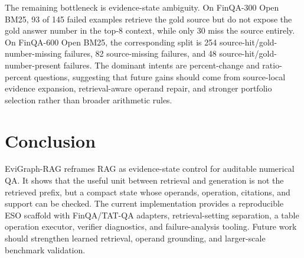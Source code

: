 \documentclass[letterpaper]{article}
\begin{document}
The remaining bottleneck is evidence-state ambiguity.
On FinQA-300 Open BM25, 93 of 145 failed examples retrieve the gold source but do not expose the gold answer number in the top-\(8\) context, while only 30 miss the source entirely.
On FinQA-600 Open BM25, the corresponding split is 254 source-hit/gold-number-missing failures, 82 source-missing failures, and 48 source-hit/gold-number-present failures.
The dominant intents are percent-change and ratio-percent questions, suggesting that future gains should come from source-local evidence expansion, retrieval-aware operand repair, and stronger portfolio selection rather than broader arithmetic rules.

\section{Conclusion}

EviGraph-RAG reframes RAG as evidence-state control for auditable numerical QA.
It shows that the useful unit between retrieval and generation is not the retrieved prefix, but a compact state whose operands, operation, citations, and support can be checked.
The current implementation provides a reproducible ESO scaffold with FinQA/TAT-QA adapters, retrieval-setting separation, a table operation executor, verifier diagnostics, and failure-analysis tooling.
Future work should strengthen learned retrieval, operand grounding, and larger-scale benchmark validation.


\end{document}

